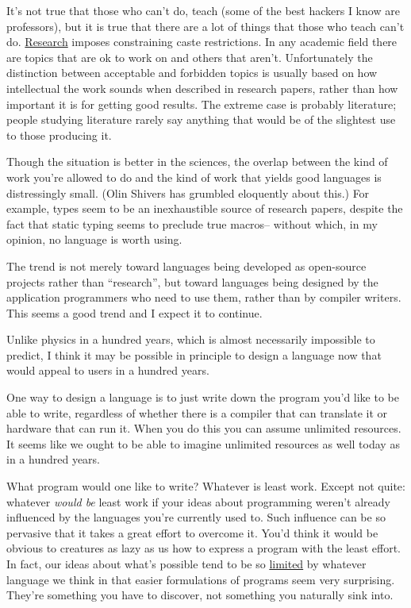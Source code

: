 \documentclass[12pt]{book}
\begin{document}
It's not true that those who can't do, teach (some of the best hackers I
know are professors), but it is true that there are a lot of things that
those who teach can't do. \href{desres.html}{Research} imposes
constraining caste restrictions. In any academic field there are topics
that are ok to work on and others that aren't. Unfortunately the
distinction between acceptable and forbidden topics is usually based on
how intellectual the work sounds when described in research papers,
rather than how important it is for getting good results. The extreme
case is probably literature; people studying literature rarely say
anything that would be of the slightest use to those producing it.

Though the situation is better in the sciences, the overlap between the
kind of work you're allowed to do and the kind of work that yields good
languages is distressingly small. (Olin Shivers has grumbled eloquently
about this.) For example, types seem to be an inexhaustible source of
research papers, despite the fact that static typing seems to preclude
true macros-- without which, in my opinion, no language is worth using.

The trend is not merely toward languages being developed as open-source
projects rather than ``research'', but toward languages being designed
by the application programmers who need to use them, rather than by
compiler writers. This seems a good trend and I expect it to continue.

Unlike physics in a hundred years, which is almost necessarily
impossible to predict, I think it may be possible in principle to design
a language now that would appeal to users in a hundred years.

One way to design a language is to just write down the program you'd
like to be able to write, regardless of whether there is a compiler that
can translate it or hardware that can run it. When you do this you can
assume unlimited resources. It seems like we ought to be able to imagine
unlimited resources as well today as in a hundred years.

What program would one like to write? Whatever is least work. Except not
quite: whatever \emph{would be} least work if your ideas about
programming weren't already influenced by the languages you're currently
used to. Such influence can be so pervasive that it takes a great effort
to overcome it. You'd think it would be obvious to creatures as lazy as
us how to express a program with the least effort. In fact, our ideas
about what's possible tend to be so \href{avg.html}{limited} by whatever
language we think in that easier formulations of programs seem very
surprising. They're something you have to discover, not something you
naturally sink into.
\end{document}
